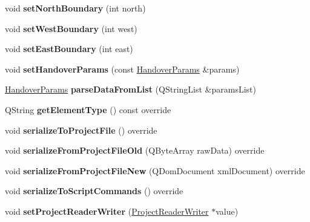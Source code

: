 \begin{DoxyCompactItemize}
\item 
void {\bfseries set\+North\+Boundary} (int north)\hypertarget{class_handover_data_a0c8a86e0349737f35ccf1bb6d76badd7}{}\label{class_handover_data_a0c8a86e0349737f35ccf1bb6d76badd7}

\item 
void {\bfseries set\+West\+Boundary} (int west)\hypertarget{class_handover_data_a58e774266ed7cea002d2e2ceb282ede0}{}\label{class_handover_data_a58e774266ed7cea002d2e2ceb282ede0}

\item 
void {\bfseries set\+East\+Boundary} (int east)\hypertarget{class_handover_data_a4821fcb178c67fcac39c865fe4d02fdc}{}\label{class_handover_data_a4821fcb178c67fcac39c865fe4d02fdc}

\item 
void {\bfseries set\+Handover\+Params} (const \hyperlink{struct_handover_params}{Handover\+Params} \&params)\hypertarget{class_handover_data_a44bf5aeb9853496e72cfbdcd1be5de3f}{}\label{class_handover_data_a44bf5aeb9853496e72cfbdcd1be5de3f}

\item 
\hyperlink{struct_handover_params}{Handover\+Params} {\bfseries parse\+Data\+From\+List} (Q\+String\+List \&params\+List)\hypertarget{class_handover_data_a8e27ad24e6f78a36e80c68b0e2c8a245}{}\label{class_handover_data_a8e27ad24e6f78a36e80c68b0e2c8a245}

\item 
Q\+String {\bfseries get\+Element\+Type} () const override\hypertarget{class_handover_data_a4e1386200bc54a49a967963baeb0c049}{}\label{class_handover_data_a4e1386200bc54a49a967963baeb0c049}

\item 
void {\bfseries serialize\+To\+Project\+File} () override\hypertarget{class_handover_data_a45511d327dbabba83a3e2699012e9336}{}\label{class_handover_data_a45511d327dbabba83a3e2699012e9336}

\item 
void {\bfseries serialize\+From\+Project\+File\+Old} (Q\+Byte\+Array raw\+Data) override\hypertarget{class_handover_data_a710b11d41d03255073c5bcf50ca96ed7}{}\label{class_handover_data_a710b11d41d03255073c5bcf50ca96ed7}

\item 
void {\bfseries serialize\+From\+Project\+File\+New} (Q\+Dom\+Document xml\+Document) override\hypertarget{class_handover_data_ad7aea1441cddf5f6fba5809685da7ad7}{}\label{class_handover_data_ad7aea1441cddf5f6fba5809685da7ad7}

\item 
void {\bfseries serialize\+To\+Script\+Commands} () override\hypertarget{class_handover_data_a1f38a95529d4c5e791a9749e796fcc44}{}\label{class_handover_data_a1f38a95529d4c5e791a9749e796fcc44}

\item 
void {\bfseries set\+Project\+Reader\+Writer} (\hyperlink{class_project_reader_writer}{Project\+Reader\+Writer} $\ast$value)\hypertarget{class_handover_data_a7ff75a2bc77e7d610c52180ce3288ef8}{}\label{class_handover_data_a7ff75a2bc77e7d610c52180ce3288ef8}

\end{DoxyCompactItemize}


